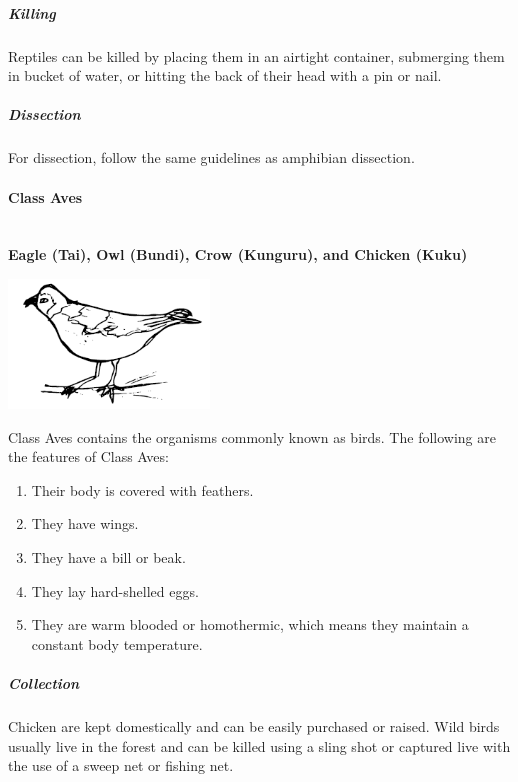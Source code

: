 \begin{multicols}{2}
\subparagraph{Killing}
Reptiles can be killed by placing them in an airtight container, submerging them in bucket of water, or hitting the back of their head with a pin or nail.

\subparagraph{Dissection}
For dissection, follow the same guidelines as amphibian dissection.

\paragraph{Class Aves}\hfill \\
\textbf{Eagle (Tai), Owl (Bundi), Crow (Kunguru), and Chicken (Kuku)}

\begin{center}
\includegraphics[width=0.4\textwidth]{./img/bird.png}
\end{center}

Class Aves contains the organisms commonly known as birds. The following are the features of Class Aves:\\
\begin{enumerate}
\item{Their body is covered with feathers.}
\item{They have wings.}
\item{They have a bill or beak.}
\item{They lay hard-shelled eggs.}
\item{They are warm blooded or homothermic, which means they maintain a constant body temperature.}
\end{enumerate}

%

\subparagraph{Collection}
Chicken are kept domestically and can be easily purchased or raised. Wild birds usually live in the forest and can be killed using a sling shot or captured live with the use of a sweep net or fishing net.


\end{multicols}
